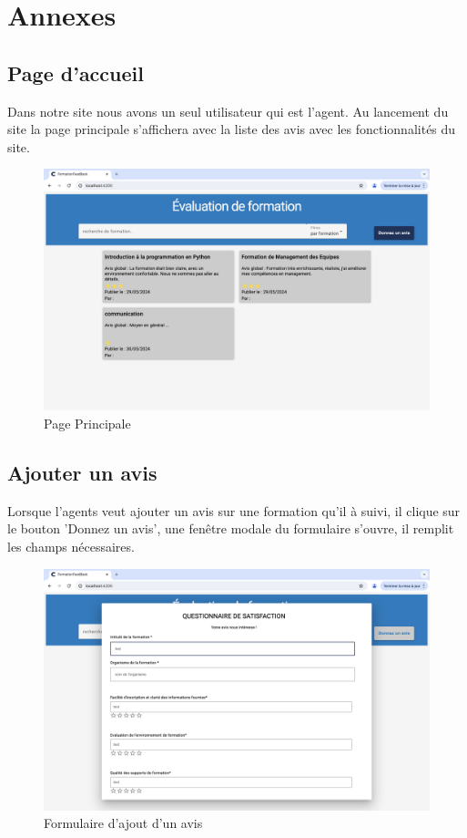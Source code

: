 \chapter*{Annexes}
 
\section*{Page d'accueil}
Dans notre site nous avons un seul utilisateur qui est l'agent. Au lancement du site la page principale s'affichera avec la liste des avis avec les fonctionnalités du site.
\medskip

\begin{figure}[h!]
    \centering
    \includegraphics[width=1\textwidth]{images/fenetres/accueil.png}
    \caption{Page Principale}
\end{figure}

\newpage

\section*{Ajouter un avis}
Lorsque l'agents veut ajouter un avis sur une formation qu'il à suivi, il clique sur le bouton 'Donnez un avis', une fenêtre modale du formulaire s'ouvre, il remplit les champs nécessaires. 
\medskip

\begin{figure}[h!]
    \centering
    \includegraphics[width=1\textwidth]{images/fenetres/AjouterAvis.png}
    \caption{Formulaire d'ajout d'un avis}
\end{figure}

